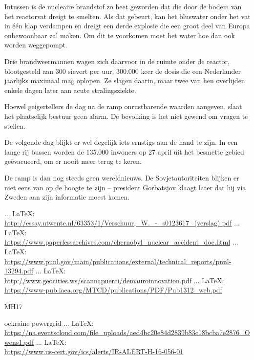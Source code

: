 \begin{thebibliography}{99}
{{Intussen is de nucleaire brandstof zo heet geworden dat die door de bodem van het reactorvat dreigt te smelten. Als dat gebeurt, kan het bluswater onder het vat in één klap verdampen en dreigt een derde explosie die een groot deel van Europa onbewoonbaar zal maken. Om dit te voorkomen moet het water hoe dan ook worden weggepompt.

Drie brandweermannen wagen zich daarvoor in de ruimte onder de reactor, blootgesteld aan 300 sievert per uur, 300.000 keer de dosis die een Nederlander jaarlijks maximaal mag oplopen. Ze slagen daarin, maar twee van hen overlijden enkele dagen later aan acute stralingsziekte.

Hoewel geigertellers de dag na de ramp onrustbarende waarden aangeven, slaat het plaatselijk bestuur geen alarm. De bevolking is het niet gewend om vragen te stellen.

De volgende dag blijkt er wel degelijk iets ernstigs aan de hand te zijn. In een lange rij bussen worden de 135.000 inwoners op 27 april uit het besmette gebied geëvacueerd, om er nooit meer terug te keren.

De ramp is dan nog steeds geen wereldnieuws. De Sovjetautoriteiten blijken er niet eens van op de hoogte te zijn – president Gorbatsjov klaagt later dat hij via Zweden aan zijn informatie moest komen.


 ... \LaTeX:\\ \url{http://essay.utwente.nl/63353/1/Verschuur,_W._-_s0123617_(verslag).pdf}
 ... \LaTeX:\\ \url{https://www.paperlessarchives.com/chernobyl_nuclear_accident_doc.html}
 ... \LaTeX:\\ \url{https://www.pnnl.gov/main/publications/external/technical_reports/pnnl-13294.pdf}
 ... \LaTeX:\\ \url{http://www.geocities.ws/scannapuerci/demauroinnovation.pdf}
 ... \LaTeX:\\ \url{https://www-pub.iaea.org/MTCD/publications/PDF/Pub1312_web.pdf}




MH17




oekraine powergrid
 ... \LaTeX:\\ \url{https://na.eventscloud.com/file_uploads/aed4bc20e84d2839b83c18bcba7e2876_Owens1.pdf}
 ... \LaTeX:\\ \url{https://www.us-cert.gov/ics/alerts/IR-ALERT-H-16-056-01}

}}
\end{thebibliography}
